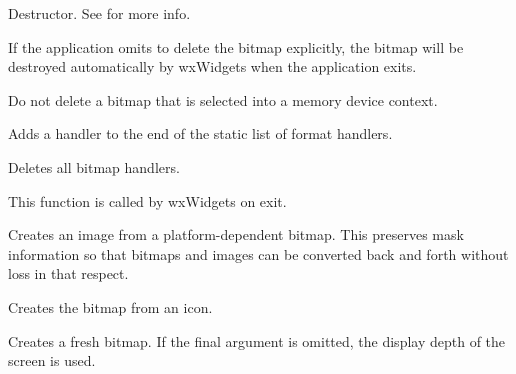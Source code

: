 \label{wxbitmapdtor}


Destructor.
See  for more info.

If the application omits to delete the bitmap explicitly, the bitmap will be
destroyed automatically by wxWidgets when the application exits.

Do not delete a bitmap that is selected into a memory device context.

\label{wxbitmapaddhandler}


Adds a handler to the end of the static list of format handlers.




\label{wxbitmapcleanuphandlers}


Deletes all bitmap handlers.

This function is called by wxWidgets on exit.

\label{wxbitmapconverttoimage}


Creates an image from a platform-dependent bitmap. This preserves
mask information so that bitmaps and images can be converted back
and forth without loss in that respect.

\label{wxbitmapcopyfromicon}


Creates the bitmap from an icon.

\label{wxbitmapcreate}


Creates a fresh bitmap. If the final argument is omitted, the display depth of
the screen is used.

